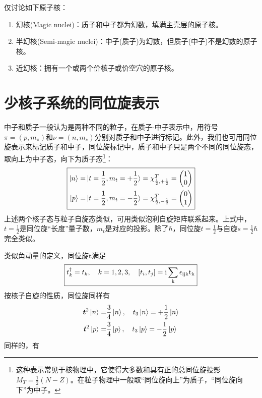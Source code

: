 仅讨论如下原子核：
\begin{enumerate}
    \item 幻核(Magic nuclei)：质子和中子都为幻数，填满主壳层的原子核。
    \item 半幻核(Semi-magic nuclei)：中子(质子)为幻数，但质子(中子)不是幻数的原子核。
    \item 近幻核：拥有一个或两个价核子或价空穴的原子核。
\end{enumerate}


\section{少核子系统的同位旋表示}
中子和质子一般认为是两种不同的粒子，在质子-中子表示中，用符号$\pi = (p, m_\pi)$和$\nu = (n, m_\nu)$分别对质子和中子进行标记。此外，我们也可用同位旋表示来标记质子和中子，同位旋标记中，质子和中子只是两个不同的同位旋态，取向上为中子态，向下为质子态\footnote{这种表示常见于核物理中，它使得大多数和具有正的总同位旋投影$M_{T} = \frac{1}{2}(N - Z)$。在粒子物理中一般取“同位旋向上”为质子，“同位旋向下”为中子。}：
\begin{equation}
    \boxed{
        \begin{aligned}
            \ket{n} =& \ket{t = \frac{1}{2}, m_{t} = +\frac{1}{2}} = \chi_{\frac{1}{2}, +\frac{1}{2}}^{T} = \begin{pmatrix}
                1 \\
                0
            \end{pmatrix} \\
            \ket{p} =& \ket{t = \frac{1}{2}, m_{t} = -\frac{1}{2}} = \chi_{\frac{1}{2}, -\frac{1}{2}}^{T} = \begin{pmatrix}
                0 \\
                1
            \end{pmatrix}
        \end{aligned}
    }
\end{equation}
上述两个核子态与粒子自旋态类似，可用类似泡利自旋矩阵联系起来。上式中，$t = \frac{1}{2}$是同位旋“长度”量子数，$m_{t}$是对应的投影。除了$\hbar$，同位旋$t = \frac{1}{2}$与自旋$s = \frac{1}{2}\hbar$完全类似。

类似角动量的定义，同位旋$\bm{t}$满足
\begin{equation}
    \boxed{
        t^{\dagger}_{k} = t_k, \quad k = 1, 2, 3,\quad \left[t_i, t_j\right] = \rm{i} \sum_{k}\epsilon_{ijk}t_{k}
    }
\end{equation}
按核子自旋的性质，同位旋同样有
\begin{align}
    \bm{t}^2 \ket{n} =& \frac{3}{4} \ket{n}, \quad t_3\ket{n} = +\frac{1}{2} \ket{n} \\
    \bm{t}^2 \ket{p} =& \frac{3}{4} \ket{p}, \quad t_3\ket{p} = -\frac{1}{2} \ket{p}
\end{align}
同样的，有



